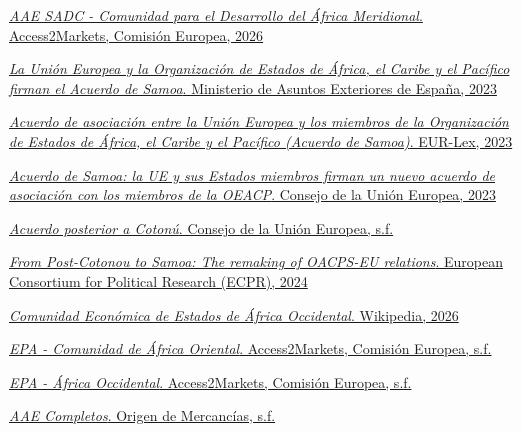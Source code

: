 \documentclass[10pt,a4paper]{article}
\begin{document}
\href{https://trade.ec.europa.eu/access-to-markets/es/content/epa-sadc-southern-african-development-community}{\textit{AAE SADC - Comunidad para el Desarrollo del África Meridional}. Access2Markets, Comisión Europea, 2026}

\href{https://www.exteriores.gob.es/es/Comunicacion/NotasPrensa/Paginas/2023_NOTAS_P/20231115_NOTA042.aspx}{\textit{La Unión Europea y la Organización de Estados de África, el Caribe y el Pacífico firman el Acuerdo de Samoa}. Ministerio de Asuntos Exteriores de España, 2023}

\href{https://eur-lex.europa.eu/ES/legal-content/summary/partnership-agreement-between-the-eu-and-its-member-states-of-the-one-part-and-the-members-of-the-organisation-of-african-caribbean-and-pacific-states-of-the-other-part-the-samoa-agreement.html?fromSummary=11}{\textit{Acuerdo de asociación entre la Unión Europea y los miembros de la Organización de Estados de África, el Caribe y el Pacífico (Acuerdo de Samoa)}. EUR-Lex, 2023}

\href{https://www.consilium.europa.eu/es/press/press-releases/2023/11/15/samoa-agreement-eu-and-its-member-states-sign-new-partnership-agreement-with-the-members-of-the-organisation-of-the-african-caribbean-and-pacific-states/}{\textit{Acuerdo de Samoa: la UE y sus Estados miembros firman un nuevo acuerdo de asociación con los miembros de la OEACP}. Consejo de la Unión Europea, 2023}

\href{https://www.consilium.europa.eu/es/policies/cotonou-agreement/}{\textit{Acuerdo posterior a Cotonú}. Consejo de la Unión Europea, s.f.}

\href{https://ecpr.eu/Events/Event/PanelDetails/14584}{\textit{From Post-Cotonou to Samoa: The remaking of OACPS-EU relations}. European Consortium for Political Research (ECPR), 2024}

\href{https://es.wikipedia.org/wiki/Comunidad_Econ%C3%B3mica_de_Estados_de_%C3%81frica_Occidental}{\textit{Comunidad Económica de Estados de África Occidental}. Wikipedia, 2026}

\href{https://trade.ec.europa.eu/access-to-markets/es/content/epa-comunidad-de-africa-oriental}{\textit{EPA - Comunidad de África Oriental}. Access2Markets, Comisión Europea, s.f.}

\href{https://trade.ec.europa.eu/access-to-markets/es/content/epa-africa-occidental}{\textit{EPA - África Occidental}. Access2Markets, Comisión Europea, s.f.}

\href{https://origen-mercancias.es/es/acuerdos-preferenciales/aae-completos}{\textit{AAE Completos}. Origen de Mercancías, s.f.}
\end{document}
